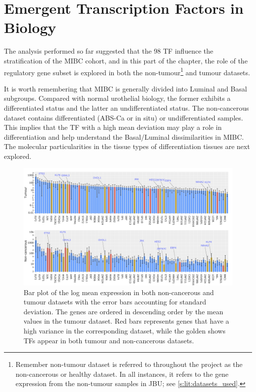 \section{Emergent Transcription Factors in Biology} \label{s:N_I:sel_tfs_bio}

The analysis performed so far suggested that the 98 TF influence the stratification of the MIBC cohort, and in this part of the chapter, the role of the regulatory gene subset is explored in both the non-tumour\footnote{Remember non-tumour dataset is referred to throughout the project as the non-cancerous or healthy dataset. In all instances, it refers to the gene expression from the non-tumour samples in JBU; see \cref{s:lit:datasets_used}.} and tumour datasets.

It is worth remembering that MIBC is generally divided into Luminal and Basal subgroups. Compared with normal urothelial biology, the former exhibits a differentiated status and the latter an undifferentiated status. The non-cancerous dataset contains differentiated (ABS-Ca or in situ) or undifferentiated samples. This implies that the TF with a high mean deviation may play a role in differentiation and help understand the Basal/Luminal dissimilarities in MIBC. The molecular particularities in the tissue types of differentiation tissues are next explored.

\begin{figure}[!b]   
    \centering
    \includegraphics[width=1.0\textwidth,height=1.0\textheight,keepaspectratio]{Sections/Network_I/Resources/selective_pruning/sel_tfs/sel_tfs_var_tum_healthy.png}
      \caption[Mean expression of the 98 TF in tumour and healthy samples]{Bar plot of the log mean expression in both non-cancerous and tumour datasets with the error bars accounting for standard deviation. The genes are ordered in descending order by the mean values in the tumour dataset. Red bars represents genes that have a high variance in the corresponding dataset, while the golden shows TFs appear in both tumour and non-cancerous datasets.}
    \label{fig:N_I:sel_tfs_var}
\end{figure}

